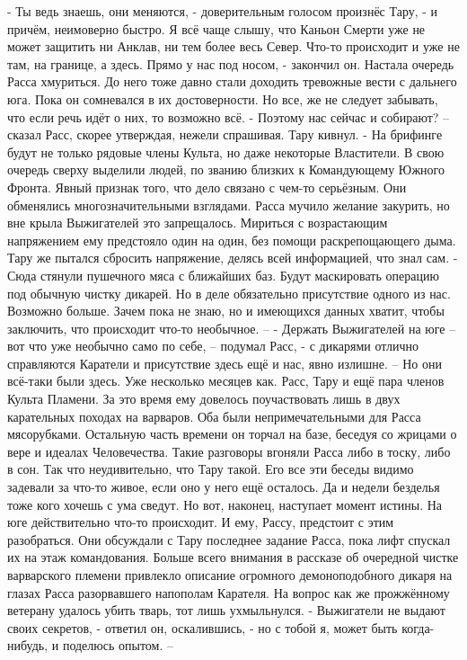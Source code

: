 \documentclass[a4paper, 12pt]{report}
\begin{document}
	- Ты ведь знаешь, они меняются, - доверительным голосом произнёс Тару, - и причём, неимоверно быстро. Я всё чаще слышу, что Каньон Смерти уже не может защитить ни Анклав, ни тем более весь Север. Что-то происходит и уже не там, на границе, а здесь. Прямо у нас под носом, - закончил он.
	Настала очередь Расса хмуриться. До него тоже давно стали доходить тревожные вести с дальнего юга. Пока он сомневался в их достоверности. Но все, же не следует забывать, что если речь идёт о них, то возможно всё.   
	- Поэтому нас сейчас и собирают? – сказал Расс, скорее утверждая, нежели спрашивая.
	Тару кивнул.
	- На брифинге будут не только рядовые члены Культа, но даже некоторые Властители. В свою очередь сверху выделили людей, по званию близких к Командующему Южного Фронта. Явный признак того, что дело связано с чем-то серьёзным.
	Они обменялись многозначительными взглядами. Расса мучило желание закурить, но вне крыла Выжигателей это запрещалось. Мириться с возрастающим напряжением ему предстояло один на один, без помощи раскрепощающего дыма. Тару же пытался сбросить напряжение, делясь всей информацией, что знал сам.
	- Сюда стянули пушечного мяса с ближайших баз. Будут маскировать операцию под обычную чистку дикарей. Но в деле обязательно присутствие одного из нас. Возможно больше. Зачем пока не знаю, но и имеющихся данных хватит, чтобы заключить, что происходит что-то необычное. –
	- Держать Выжигателей на юге – вот что уже необычно само по себе, – подумал Расс, - с дикарями отлично справляются Каратели и присутствие здесь ещё и нас, явно излишне. –
Но они всё-таки были здесь. Уже несколько месяцев как. Расс, Тару и ещё пара членов Культа Пламени. За это время ему довелось поучаствовать лишь в двух карательных походах на варваров. Оба были непримечательными для Расса мясорубками. Остальную часть времени он торчал на базе, беседуя со жрицами о вере и идеалах Человечества. Такие разговоры вгоняли Расса либо в тоску, либо в сон. Так что неудивительно, что Тару такой. Его все эти беседы видимо задевали за что-то живое, если оно у него ещё осталось. Да и недели безделья тоже кого хочешь с ума сведут. 
Но вот, наконец, наступает момент истины. 
На юге действительно что-то происходит. И ему, Рассу, предстоит с этим разобраться.
Они обсуждали с Тару последнее задание Расса, пока лифт спускал их на этаж командования. Больше всего внимания в рассказе об очередной чистке варварского племени привлекло описание огромного демоноподобного дикаря на глазах Расса разорвавшего напополам Карателя. На вопрос как же прожжённому ветерану удалось убить тварь, тот лишь ухмыльнулся.
- Выжигатели не выдают своих секретов, - ответил он, оскалившись, - но с тобой я, может быть когда-нибудь, и поделюсь опытом. –
\end{document}
